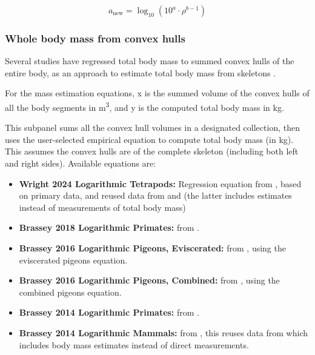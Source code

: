 \documentclass{article}
\begin{document}
\begin{equation}
a_{\text{new}} = \log_{10} \left( 10^a \cdot \rho^{b - 1} \right)
\end{equation}




\subsubsection{Whole body mass from convex hulls}

Several studies have regressed total body mass to summed convex hulls of the entire body, as an approach to estimate total body mass from skeletons \cite{brasseyScalingConvexHull2014,brasseyConvexhullMassEstimates2016,brasseyVolumetricTechniqueFossil2018,wrightVolumetricElementscalingMass2024}. 

For the mass estimation equations, x is the summed volume of the convex hulls of all the body segments in \si{m^3}, and y is the computed total body mass in \si{kg}.

This subpanel sums all the convex hull volumes in a designated collection, then uses the user-selected empirical equation to compute total body mass (in kg). This assumes the convex hulls are of the complete skeleton (including both left and right sides). Available equations are:

\begin{itemize}
    \item \textbf{Wright 2024 Logarithmic Tetrapods:} Regression equation from \cite{wrightVolumetricElementscalingMass2024}, based on primary data, and reused data from \cite{coathamConvexHullEstimation2021} and \cite{sellersMinimumConvexHull2012a} (the latter includes estimates instead of measurements of total body mass)
    \item \textbf{Brassey 2018 Logarithmic Primates:} from \cite{brasseyVolumetricTechniqueFossil2018}.
    \item \textbf{Brassey 2016 Logarithmic Pigeons, Eviscerated:} from \cite{brasseyConvexhullMassEstimates2016}, using the eviscerated pigeons equation.
    \item \textbf{Brassey 2016 Logarithmic Pigeons, Combined:} from \cite{brasseyConvexhullMassEstimates2016}, using the combined pigeons equation.
    \item \textbf{Brassey 2014 Logarithmic Primates:} from \cite{brasseyScalingConvexHull2014}.
    \item \textbf{Brassey 2014 Logarithmic Mammals:} from \cite{brasseyScalingConvexHull2014}, this reuses data from \cite{sellersMinimumConvexHull2012a} which includes body mass estimates instead of direct measurements.
\end{itemize}
\end{document}
